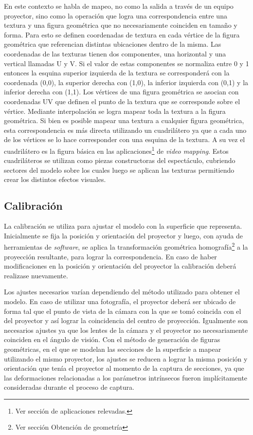 En este contexto se habla de mapeo, no como la salida a través de un equipo proyector, sino como la operación que logra una correspondencia entre una textura y una figura geométrica que no necesariamente coinciden en tamaño y forma. Para esto se definen coordenadas de textura en cada vértice de la figura geométrica que referencian distintas ubicaciones dentro de la misma.
Las coordenadas de las texturas tienen dos componentes, una horizontal y una vertical llamadas U y V. Si el valor de estas componentes se normaliza entre 0 y 1 entonces la esquina superior izquierda de la textura se corresponderá con la coordenada (0,0), la superior derecha con (1,0), la inferior izquierda con (0,1) y la inferior derecha con (1,1).
Los vértices de una figura geométrica se asocian con coordenadas UV que definen el punto de la textura que se corresponde sobre el vértice. Mediante interpolación se logra mapear toda la textura a la figura geométrica.
Si bien es posible mapear una textura a cualquier figura geométrica, esta correspondencia es más directa utilizando un cuadrilátero ya que a cada uno de los vértices se lo hace corresponder con una esquina de la textura. A su vez el cuadrilátero es la figura básica en las aplicaciones\footnote{Ver sección de aplicaciones relevadas.} de \emph{video mapping}.
Estos cuadriláteros se utilizan como piezas constructoras del espectáculo, cubriendo sectores del modelo sobre los cuales luego se aplican las texturas permitiendo crear los distintos efectos visuales.

\subsection{Calibración}
La calibración se utiliza para ajustar el modelo con la superficie que representa. Inicialmente se fija la posición y orientación del proyector y luego, con ayuda de herramientas de \emph{software}, se aplica la transformación geométrica homografía\footnote{Ver sección Obtención de geometría} a la proyección resultante, para lograr la correspondencia.
En caso de haber modificaciones en la posición y orientación del proyector la calibración deberá realizase nuevamente.

Los ajustes necesarios varían dependiendo del método utilizado para obtener el modelo. En caso de utilizar una fotografía, el proyector deberá ser ubicado de forma tal que el punto de vista de la cámara con la que se tomó coincida con el del proyector y así lograr la coincidencia del centro de proyección. Igualmente son necesarios ajustes ya que los lentes de la cámara y el proyector no necesariamente coinciden en el ángulo de visión\cite{LibroCompGrafica2}\cite{LibroPhotographicOptics}. Con el método de generación de figuras geométricas, en el que se modelan las secciones de la superficie a mapear utilizando el mismo proyector, los ajustes se reducen a lograr la misma posición y orientación que tenía el proyector al momento de la captura de secciones, ya que las deformaciones relacionadas a los parámetros intrínsecos fueron implícitamente consideradas durante el proceso de captura.

